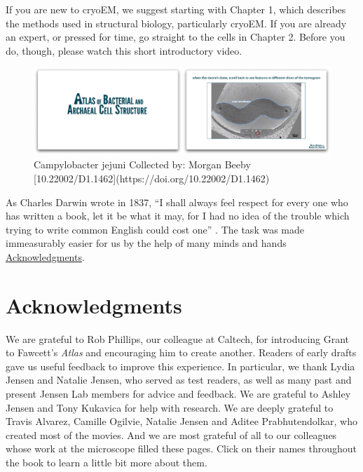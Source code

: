 \documentclass[]{tufte-book}
\begin{document}
If you are new to cryoEM, we suggest starting with Chapter 1, which
describes the methods used in structural biology, particularly cryoEM.
If you are already an expert, or pressed for time, go straight to the
cells in Chapter 2. Before you do, though, please watch this short
introductory video.

\begin{figure}
\includegraphics{movie_stills/0_1} \caption[Campylobacter jejuni Collected by]{Campylobacter jejuni Collected by: Morgan Beeby [10.22002/D1.1462](https://doi.org/10.22002/D1.1462)}\label{fig:unnamed-chunk-1}
\end{figure}

As Charles Darwin wrote in 1837, ``I shall always feel respect for every
one who has written a book, let it be what it may, for I had no idea of
the trouble which trying to write common English could cost one''
\citep{darwin1888}. The task was made immeasurably easier for us by the
help of many minds and hands
\protect\hyperlink{acknowledgments}{Acknowledgments}.

\hypertarget{acknowledgments}{\section*{Acknowledgments}\label{acknowledgments}}

We are grateful to Rob Phillips, our colleague at Caltech, for
introducing Grant to Fawcett's \emph{Atlas} and encouraging him to
create another. Readers of early drafts gave us useful feedback to
improve this experience. In particular, we thank Lydia Jensen and
Natalie Jensen, who served as test readers, as well as many past and
present Jensen Lab members for advice and feedback. We are grateful to
Ashley Jensen and Tony Kukavica for help with research. We are deeply
grateful to Travis Alvarez, Camille Ogilvie, Natalie Jensen and Aditee
Prabhutendolkar, who created most of the movies. And we are most
grateful of all to our colleagues whose work at the microscope filled
these pages. Click on their names throughout the book to learn a little
bit more about them.
\end{document}
